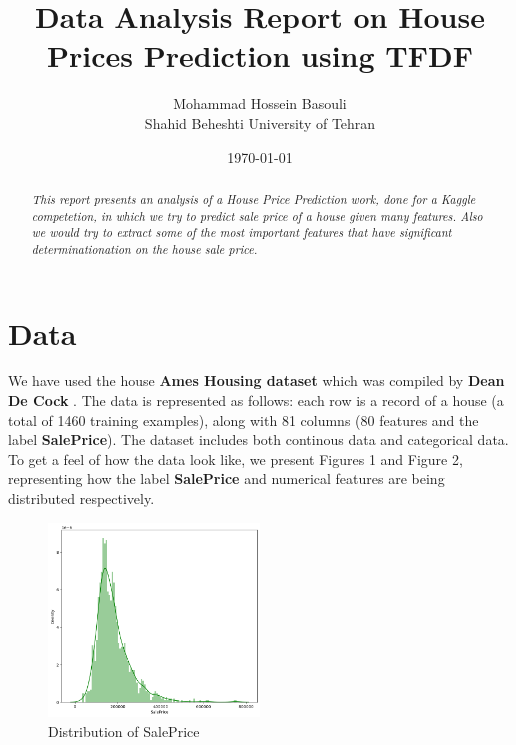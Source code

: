 \documentclass[a4paper,12pt]{article}
\title{Data Analysis Report on House Prices Prediction using TFDF}
\author{Mohammad Hossein Basouli \\ Shahid Beheshti University of Tehran}
\date{\today}
\begin{document}
\maketitle

\begin{abstract}
    \textit{This report presents an analysis of a House Price Prediction work, done for a Kaggle competetion, in which we try to predict sale price of a house given many features. Also we would try to extract some of the most important features that have significant determinationation on the house sale price.}
\end{abstract}

\section{Data}
We have used the house \textbf{Ames Housing dataset} which was compiled by \textbf{Dean De Cock} \cite{ameshousingdataset2023}.
The data is represented as follows: each row is a record of a house (a total of 1460 training examples), along with 81 columns (80 features and the label \textbf{SalePrice}). The dataset includes both continous data and categorical data.
To get a feel of how the data look like, we present Figures 1 and Figure 2, representing how the label \textbf{SalePrice} and numerical features are being distributed respectively.

\begin{figure}[h] %
    \centering
    \includegraphics[width=0.5\textwidth]{./images/1.png} %
    \caption{Distribution of SalePrice}
\end{figure}
\end{document}
